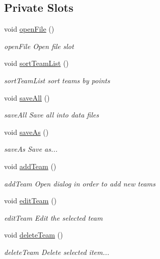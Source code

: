 \subsection*{Private Slots}
\begin{DoxyCompactItemize}
\item 
void \hyperlink{class_main_window_a288b768c3c21a9171bdc56fe845ece8b}{open\+File} ()
\begin{DoxyCompactList}\small\item\em open\+File Open file slot \end{DoxyCompactList}\item 
void \hyperlink{class_main_window_a32cf6689bc8f4597363cbe8e4e7e5146}{sort\+Team\+List} ()
\begin{DoxyCompactList}\small\item\em sort\+Team\+List sort teams by points \end{DoxyCompactList}\item 
void \hyperlink{class_main_window_a149085ca2d6cce59ecb59dcbf0892c07}{save\+All} ()
\begin{DoxyCompactList}\small\item\em save\+All Save all into data files \end{DoxyCompactList}\item 
void \hyperlink{class_main_window_a7fbef0054cdec7bbbf3c06fb12af473c}{save\+As} ()
\begin{DoxyCompactList}\small\item\em save\+As Save as... \end{DoxyCompactList}\item 
void \hyperlink{class_main_window_ade64c249edd6ebfab4fc83dbd7d7b334}{add\+Team} ()
\begin{DoxyCompactList}\small\item\em add\+Team Open dialog in order to add new teams \end{DoxyCompactList}\item 
void \hyperlink{class_main_window_a637b22ad7b085a1664384ea3ab8084cd}{edit\+Team} ()
\begin{DoxyCompactList}\small\item\em edit\+Team Edit the selected team \end{DoxyCompactList}\item 
void \hyperlink{class_main_window_a7b8cd49500ffd80cb3c666750c658f5d}{delete\+Team} ()
\begin{DoxyCompactList}\small\item\em delete\+Team Delete selected item... \end{DoxyCompactList}\item 

\end{DoxyCompactItemize}
